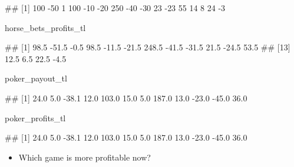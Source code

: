 \documentclass[
]{book}
\newenvironment{Shaded}{\begin{snugshade}}{\end{snugshade}}
\newcommand{\NormalTok}[1]{#1}
\providecommand{\tightlist}{%
  \setlength{\itemsep}{0pt}\setlength{\parskip}{0pt}}
\begin{document}
\begin{Shaded}
\begin{Highlighting}[]
\NormalTok{\#\#  [1] 100 {-}50   1 100 {-}10 {-}20 250 {-}40 {-}30  23 {-}23  55  14   8  24  {-}3}
\end{Highlighting}
\end{Shaded}

\begin{Shaded}
\begin{Highlighting}[]
\NormalTok{horse\_bets\_profits\_tl}
\end{Highlighting}
\end{Shaded}

\begin{Shaded}
\begin{Highlighting}[]
\NormalTok{\#\#  [1]  98.5 {-}51.5  {-}0.5  98.5 {-}11.5 {-}21.5 248.5 {-}41.5 {-}31.5  21.5 {-}24.5  53.5}
\NormalTok{\#\# [13]  12.5   6.5  22.5  {-}4.5}
\end{Highlighting}
\end{Shaded}

\begin{Shaded}
\begin{Highlighting}[]
\NormalTok{poker\_payout\_tl}
\end{Highlighting}
\end{Shaded}

\begin{Shaded}
\begin{Highlighting}[]
\NormalTok{\#\#  [1]  24.0   5.0 {-}38.1  12.0 103.0  15.0   5.0 187.0  13.0 {-}23.0 {-}45.0  36.0}
\end{Highlighting}
\end{Shaded}

\begin{Shaded}
\begin{Highlighting}[]
\NormalTok{poker\_profits\_tl}
\end{Highlighting}
\end{Shaded}

\begin{Shaded}
\begin{Highlighting}[]
\NormalTok{\#\#  [1]  24.0   5.0 {-}38.1  12.0 103.0  15.0   5.0 187.0  13.0 {-}23.0 {-}45.0  36.0}
\end{Highlighting}
\end{Shaded}

\begin{itemize}
\tightlist
\item
  Which game is more profitable now?
\end{itemize}
\end{document}
